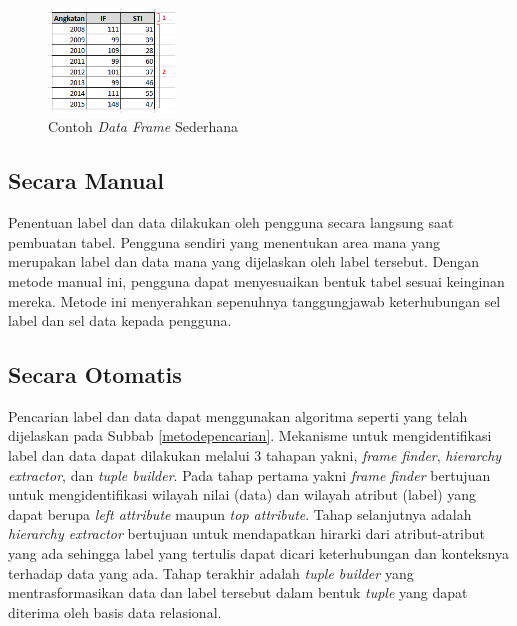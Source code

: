 \begin{figure}[htb]
    \centering
    \includegraphics[width=0.3\textwidth]{resources/chapter-3-simple-dataframe.png}
    \caption{Contoh \textit{Data Frame} Sederhana}
	\label{DataFrameSederhana}
\end{figure}

	\subsection{Secara Manual}
	Penentuan label dan data dilakukan oleh pengguna secara langsung saat pembuatan tabel. Pengguna sendiri yang menentukan area mana yang merupakan label dan data mana yang dijelaskan oleh label tersebut. Dengan metode manual ini, pengguna dapat menyesuaikan bentuk tabel sesuai keinginan mereka. Metode ini menyerahkan sepenuhnya tanggungjawab keterhubungan sel label dan sel data kepada pengguna.

	\subsection{Secara Otomatis}
	Pencarian label dan data dapat menggunakan algoritma seperti yang telah dijelaskan pada Subbab \ref{metodepencarian}. Mekanisme untuk mengidentifikasi label dan data dapat dilakukan melalui 3 tahapan yakni, \textit{frame finder}, \textit{hierarchy extractor}, dan \textit{tuple builder}. Pada tahap pertama yakni \textit{frame finder} bertujuan untuk mengidentifikasi wilayah nilai (data) dan wilayah atribut (label) yang dapat berupa \textit{left attribute} maupun \textit{top attribute}. Tahap selanjutnya adalah \textit{hierarchy extractor} bertujuan untuk mendapatkan hirarki dari atribut-atribut yang ada sehingga label yang tertulis dapat dicari keterhubungan dan konteksnya terhadap data yang ada. Tahap terakhir adalah \textit{tuple builder} yang mentrasformasikan data dan label tersebut dalam bentuk \textit{tuple} yang dapat diterima oleh basis data relasional.

